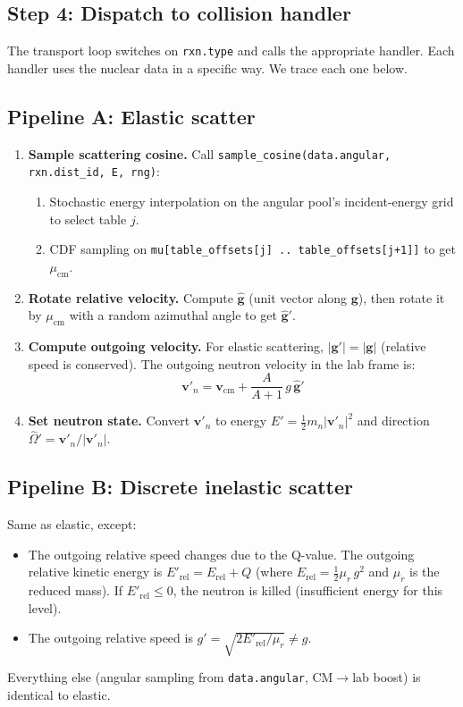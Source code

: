 \documentclass[11pt,a4paper]{article}
\begin{document}
\subsection{Step 4: Dispatch to collision handler}
The transport loop switches on \texttt{rxn.type} and calls the appropriate handler. Each handler uses the nuclear data in a specific way. We trace each one below.

\subsection{Pipeline A: Elastic scatter}
\label{sec:pipeline-elastic}

\begin{enumerate}[leftmargin=1.4em]
  \item \textbf{Sample scattering cosine.} Call \texttt{sample\_cosine(data.angular, rxn.dist\_id, E, rng)}:
  \begin{enumerate}
    \item Stochastic energy interpolation on the angular pool's incident-energy grid to select table $j$.
    \item CDF sampling on \texttt{mu[table\_offsets[j] .. table\_offsets[j+1]]} to get $\mu_\text{cm}$.
  \end{enumerate}
  \item \textbf{Rotate relative velocity.} Compute $\hat{\mathbf{g}}$ (unit vector along $\mathbf{g}$), then rotate it by $\mu_\text{cm}$ with a random azimuthal angle to get $\hat{\mathbf{g}}'$.
  \item \textbf{Compute outgoing velocity.} For elastic scattering, $|\mathbf{g}'| = |\mathbf{g}|$ (relative speed is conserved). The outgoing neutron velocity in the lab frame is:
  \[
  \mathbf{v}'_n = \mathbf{v}_\text{cm} + \frac{A}{A+1}\,g\,\hat{\mathbf{g}}'
  \]
  \item \textbf{Set neutron state.} Convert $\mathbf{v}'_n$ to energy $E' = \frac{1}{2}m_n |\mathbf{v}'_n|^2$ and direction $\hat{\Omega}' = \mathbf{v}'_n / |\mathbf{v}'_n|$.
\end{enumerate}

\subsection{Pipeline B: Discrete inelastic scatter}

Same as elastic, except:
\begin{itemize}[leftmargin=1.4em]
  \item The outgoing relative speed changes due to the Q-value. The outgoing relative kinetic energy is $E'_\text{rel} = E_\text{rel} + Q$ (where $E_\text{rel} = \frac{1}{2}\mu_r\,g^2$ and $\mu_r$ is the reduced mass). If $E'_\text{rel} \le 0$, the neutron is killed (insufficient energy for this level).
  \item The outgoing relative speed is $g' = \sqrt{2 E'_\text{rel} / \mu_r} \ne g$.
\end{itemize}
Everything else (angular sampling from \texttt{data.angular}, CM$\to$lab boost) is identical to elastic.
\end{document}
